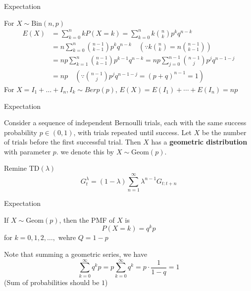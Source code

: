 \documentclass[8pt]{beamer}
\newcommand{\tb}[1]{\textbf{#1}}
\begin{document}
\begin{frame}{Expectation}
    \begin{example}
        For $X \sim \text{Bin}(n,p)$
        \[
            \begin{aligned}
                E(X) &= \sum_{k=0}^n k P(X=k) = \sum_{k=0}^n k \binom{n}{k} p^k q^{n-k}\\
                &= n \sum^n_{k=0} \binom{n-1}{k-1} p^k q^{n-k} \quad (\because k \binom{n}{k} = n \binom{n-1}{k-1})\\
                &= np \sum^n_{k=1} \binom{n-1}{k-1} p^{k-1} q^{n-k} = np \sum_{j=0}^{n-1} \binom{n-1}{j}p^j q^{n-1-j} \\
                &= np \quad (\because \binom{n-1}{j}p^j q^{n-1-j} = (p + q)^{n-1} = 1)
            \end{aligned}
        \]
        For $X = I_1 + \dots + I_n, I_k \sim Berp(p)$, $E(X) = E(I_1) + \cdots + E(I_n) = np$
    \end{example}
\end{frame}


\begin{frame}{Expectation}
    \begin{definition}
        Consider a sequence of independent Bernoulli trials, each with the same success probability $p \in (0,1)$, with trials repeated until success. Let $X$ be the number of trials before the first successful trial. Then $X$ has a \tb{geometric distribution} with parameter $p$. we denote this by $X \sim \text{Geom}(p)$.\newline
    \end{definition}

    Remine TD$(\lambda)$
    \[
        G^\lambda_t = (1-\lambda) \sum^\infty_{n=1} \lambda^{n-1} G_{t:t+n}
    \]
\end{frame}

\begin{frame}{Expectation}
    \begin{theorem}
        If $X\sim\text{Geom}(p)$, then the PMF of $X$ is 
        \[
            P(X=k) = q^k p
        \]
        for $k = 0,1,2,\dots, $ wehre $Q = 1-p$
    \end{theorem}
    Note that summing a geometric series, we have
    \[
        \sum^\infty_{k=0} q^k p = p \sum^\infty_{k=0} q^k = p \cdot \frac{1}{1-q} = 1
    \]
    (Sum of probabilities should be $1$)
\end{frame}
\end{document}
